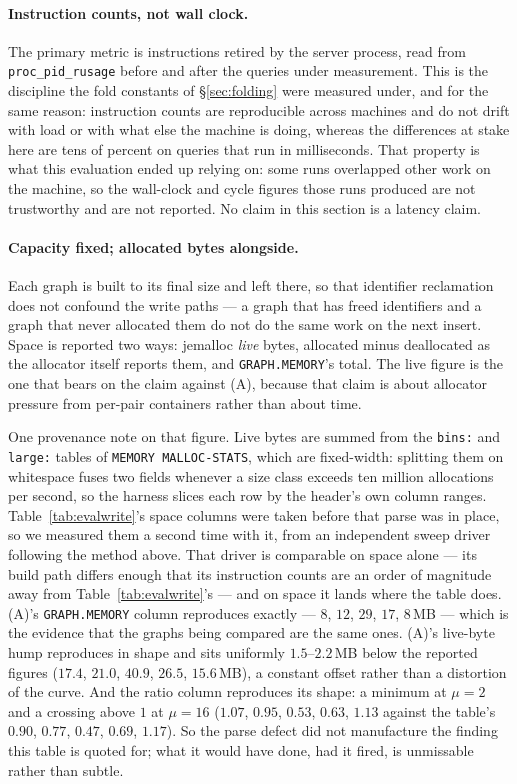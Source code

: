 \documentclass[11pt,a4paper]{article}
\theoremstyle{plain}
\theoremstyle{definition}
\theoremstyle{remark}
\begin{document}
\paragraph{Instruction counts, not wall clock.} The primary metric is
instructions retired by the server process, read from \texttt{proc\_pid\_rusage}
before and after the queries under measurement. This is the discipline the fold
constants of \S\ref{sec:folding} were measured under, and for the same reason:
instruction counts are reproducible across machines and do not drift with load
or with what else the machine is doing, whereas the differences at stake here
are tens of percent on queries that run in milliseconds. That property is what
this evaluation ended up relying on: some runs overlapped other work on the
machine, so the wall-clock and cycle figures those runs produced are not
trustworthy and are not reported. No claim in this section is a latency claim.

\paragraph{Capacity fixed; allocated bytes alongside.} Each graph is built to
its final size and left there, so that identifier reclamation does not confound
the write paths --- a graph that has freed identifiers and a graph that never
allocated them do not do the same work on the next insert. Space is reported
two ways: jemalloc \emph{live} bytes, allocated minus deallocated as the
allocator itself reports them, and \texttt{GRAPH.MEMORY}'s total. The live
figure is the one that bears on the claim against (A), because that claim is
about allocator pressure from per-pair containers rather than about time.

One provenance note on that figure. Live bytes are summed from the
\texttt{bins:} and \texttt{large:} tables of \texttt{MEMORY MALLOC-STATS}, which
are fixed-width: splitting them on whitespace fuses two fields whenever a size
class exceeds ten million allocations per second, so the harness slices each
row by the header's own column ranges. Table~\ref{tab:evalwrite}'s space
columns were taken before that parse was in place, so we measured them a second
time with it, from an independent sweep driver following the method above. That
driver is comparable on space alone --- its build path differs enough that its
instruction counts are an order of magnitude away from
Table~\ref{tab:evalwrite}'s --- and on space it lands where the table does. (A)'s \texttt{GRAPH.MEMORY} column
reproduces exactly --- $8$, $12$, $29$, $17$, $8$\,MB --- which is the evidence
that the graphs being compared are the same ones. (A)'s live-byte hump
reproduces in shape and sits uniformly $1.5$--$2.2$\,MB below the reported
figures ($17.4$, $21.0$, $40.9$, $26.5$, $15.6$\,MB), a constant offset rather
than a distortion of the curve. And the ratio column reproduces its shape: a
minimum at $\mu = 2$ and a crossing above $1$ at $\mu = 16$
($1.07$, $0.95$, $0.53$, $0.63$, $1.13$ against the table's $0.90$, $0.77$,
$0.47$, $0.69$, $1.17$). So the parse defect did not manufacture the finding
this table is quoted for; what it would have done, had it fired, is unmissable
rather than subtle.
\end{document}
